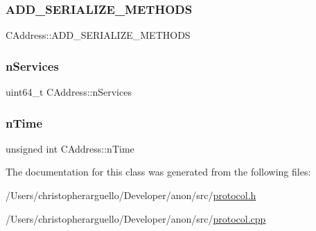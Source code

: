\subsubsection{\texorpdfstring{A\+D\+D\+\_\+\+S\+E\+R\+I\+A\+L\+I\+Z\+E\+\_\+\+M\+E\+T\+H\+O\+DS}{ADD\_SERIALIZE\_METHODS}}
{\footnotesize\ttfamily C\+Address\+::\+A\+D\+D\+\_\+\+S\+E\+R\+I\+A\+L\+I\+Z\+E\+\_\+\+M\+E\+T\+H\+O\+DS}

\mbox{\label{class_c_address_a6a4a6aa020d0d558f238c7d04dd986c3}} 
\subsubsection{\texorpdfstring{n\+Services}{nServices}}
{\footnotesize\ttfamily uint64\+\_\+t C\+Address\+::n\+Services}

\mbox{\label{class_c_address_ac1c44aac968b11f90ce529b133ae4e9b}} 
\subsubsection{\texorpdfstring{n\+Time}{nTime}}
{\footnotesize\ttfamily unsigned int C\+Address\+::n\+Time}



The documentation for this class was generated from the following files\+:\begin{DoxyCompactItemize}
\item 
/\+Users/christopherarguello/\+Developer/anon/src/\mbox{\hyperlink{protocol_8h}{protocol.\+h}}\item 
/\+Users/christopherarguello/\+Developer/anon/src/\mbox{\hyperlink{protocol_8cpp}{protocol.\+cpp}}\end{DoxyCompactItemize}
